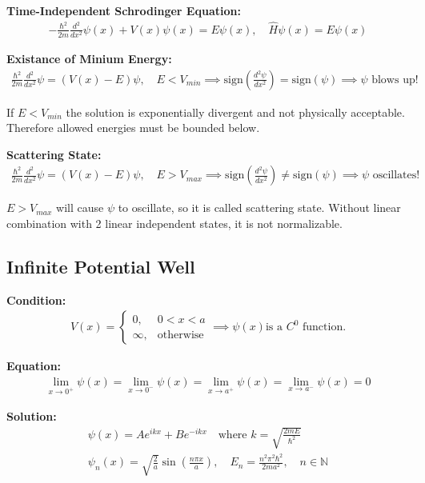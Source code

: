 \documentclass[12pt]{article}
\begin{document}
\textbf{Time-Independent Schrodinger Equation: }
\begin{align}
    -\frac{\hbar^2}{2m} \frac{d^2}{dx^2} \psi(x) + V(x) \psi(x) = E \psi(x), \quad \hat{H} \psi(x) = E \psi(x) 
\end{align} 

\textbf{Existance of Minium Energy: } 
\begin{align}
    \frac{\hbar^2}{2m} \frac{d^2}{dx^2} \psi = (V(x) - E) \psi, \quad E < V_{min} \implies \text{sign}(\frac{d^2 \psi}{dx^2}) = \text{sign}(\psi) \implies \psi \text{ blows up!} 
\end{align} 

If $E < V_{min}$ the solution is exponentially divergent and not physically acceptable. Therefore allowed energies must be bounded below. 
~ 

\textbf{Scattering State: }
\begin{align}
    \frac{\hbar^2}{2m} \frac{d^2}{dx^2} \psi = (V(x) - E) \psi, \quad E > V_{max} \implies \text{sign}(\frac{d^2 \psi}{dx^2}) \neq \text{sign}(\psi) \implies \psi \text{ oscillates! } 
\end{align} 

$E > V_{max}$ will cause $\psi$ to oscillate, so it is called scattering state. Without linear combination with 2 linear independent states, it is not normalizable. 

\subsection{Infinite Potential Well }

\textbf{Condition: } 
\begin{align}V(x) = \begin{cases}
    0, & 0 < x < a \\
    \infty, & \text{otherwise}
\end{cases} \implies \psi(x) \text{is a $C^0$ function.} 
\end{align} 

\textbf{Equation: } 
\begin{align}
    \lim_{x \to 0^+} \psi(x) = \lim_{x \to 0^-} \psi(x) = \lim_{x \to a^+} \psi(x) = \lim_{x \to a^-} \psi(x) = 0 
\end{align} 

\textbf{Solution: }
\begin{align}
    \psi(x) = A e^{ikx} + B e^{-ikx} \quad \text{where } k = \sqrt{\frac{2mE}{\hbar^2}} \\
    \psi_n(x) = \sqrt{\frac{2}{a}} \sin\left( \frac{n\pi x}{a} \right), \quad E_n = \frac{n^2 \pi^2 \hbar^2}{2ma^2}, \quad n \in \mathbb{N}
\end{align}
\end{document}
